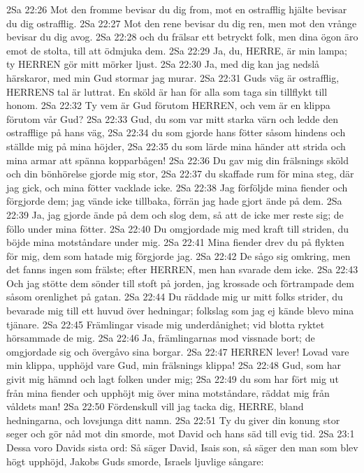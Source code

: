 2Sa 22:26  Mot den fromme bevisar du dig from, mot en ostrafflig hjälte bevisar du dig ostrafflig.
2Sa 22:27  Mot den rene bevisar du dig ren, men mot den vrånge bevisar du dig avog.
2Sa 22:28  och du frälsar ett betryckt folk, men dina ögon äro emot de stolta, till att ödmjuka dem.
2Sa 22:29  Ja, du, HERRE, är min lampa; ty HERREN gör mitt mörker ljust.
2Sa 22:30  Ja, med dig kan jag nedslå härskaror, med min Gud stormar jag murar.
2Sa 22:31  Guds väg är ostrafflig, HERRENS tal är luttrat. En sköld är han för alla som taga sin tillflykt till honom.
2Sa 22:32  Ty vem är Gud förutom HERREN, och vem är en klippa förutom vår Gud?
2Sa 22:33  Gud, du som var mitt starka värn och ledde den ostrafflige på hans väg,
2Sa 22:34  du som gjorde hans fötter såsom hindens och ställde mig på mina höjder,
2Sa 22:35  du som lärde mina händer att strida och mina armar att spänna kopparbågen!
2Sa 22:36  Du gav mig din frälsnings sköld och din bönhörelse gjorde mig stor,
2Sa 22:37  du skaffade rum för mina steg, där jag gick, och mina fötter vacklade icke.
2Sa 22:38  Jag förföljde mina fiender och förgjorde dem; jag vände icke tillbaka, förrän jag hade gjort ände på dem.
2Sa 22:39  Ja, jag gjorde ände på dem och slog dem, så att de icke mer reste sig; de föllo under mina fötter.
2Sa 22:40  Du omgjordade mig med kraft till striden, du böjde mina motståndare under mig.
2Sa 22:41  Mina fiender drev du på flykten för mig, dem som hatade mig förgjorde jag.
2Sa 22:42  De sågo sig omkring, men det fanns ingen som frälste; efter HERREN, men han svarade dem icke.
2Sa 22:43  Och jag stötte dem sönder till stoft på jorden, jag krossade och förtrampade dem såsom orenlighet på gatan.
2Sa 22:44  Du räddade mig ur mitt folks strider, du bevarade mig till ett huvud över hedningar; folkslag som jag ej kände blevo mina tjänare.
2Sa 22:45  Främlingar visade mig underdånighet; vid blotta ryktet hörsammade de mig.
2Sa 22:46  Ja, främlingarnas mod vissnade bort; de omgjordade sig och övergåvo sina borgar.
2Sa 22:47  HERREN lever! Lovad vare min klippa, upphöjd vare Gud, min frälsnings klippa!
2Sa 22:48  Gud, som har givit mig hämnd och lagt folken under mig;
2Sa 22:49  du som har fört mig ut från mina fiender och upphöjt mig över mina motståndare, räddat mig från våldets man!
2Sa 22:50  Fördenskull vill jag tacka dig, HERRE, bland hedningarna, och lovsjunga ditt namn.
2Sa 22:51  Ty du giver din konung stor seger och gör nåd mot din smorde, mot David och hans säd till evig tid.
2Sa 23:1  Dessa voro Davids sista ord: Så säger David, Isais son, så säger den man som blev högt upphöjd, Jakobs Guds smorde, Israels ljuvlige sångare:
